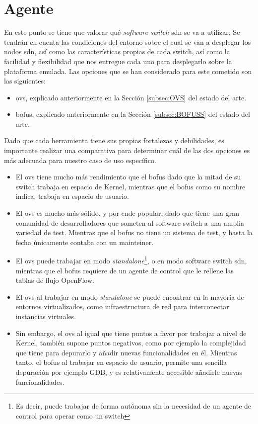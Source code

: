 \section{Agente }
\label{sec:ana_switch}

En este punto se tiene que valorar qué \textit{software switch} \gls{sdn} se va a utilizar. Se tendrán en cuenta las condiciones del entorno sobre el cual se van a desplegar los nodos \gls{sdn}, así como las características propias de cada switch, así como la facilidad y flexibilidad que nos entregue cada uno para desplegarlo sobre la plataforma emulada. Las opciones que se han considerado para este cometido son las siguientes:

\begin{itemize}
    \item \gls{ovs}, explicado anteriormente en la Sección \ref{subsec:OVS} del estado del arte.

    \item \gls{bofus}, explicado anteriormente en la Sección \ref{subsec:BOFUSS} del estado del arte.
\end{itemize}

Dado que cada herramienta tiene sus propias fortalezas y debilidades, es importante realizar una comparativa para determinar cuál de las dos opciones es más adecuada para nuestro caso de uso específico.

\begin{itemize}
    \item El \gls{ovs} tiene mucho más rendimiento que el \gls{bofus} dado que la mitad de su switch trabaja en espacio de Kernel, mientras que el \gls{bofus} como su nombre indica, trabaja en espacio de usuario.
    \item El \gls{ovs} es mucho más sólido, y por ende popular, dado que tiene una gran comunidad de desarrolladores que someten al software switch a una amplia variedad de test. Mientras que el \gls{bofus} no tiene un sistema de test, y hasta la fecha únicamente contaba con un mainteiner.
    \item El \gls{ovs} puede trabajar en modo \textit{standalone}\footnote{Es decir, puede trabajar de forma autónoma sin la necesidad de un agente de control para operar como un switch}, o en modo software switch \gls{sdn}, mientras que el \gls{bofus} requiere de un agente de control que le rellene las tablas de flujo OpenFlow.
    \item El \gls{ovs} al trabajar en modo \textit{standalone} se puede encontrar en la mayoría de entornos virtualizados, como infraestructura de red para interconectar instancias virtuales.
    \item Sin embargo, el \gls{ovs} al igual que tiene puntos a favor por trabajar a nivel de Kernel, también supone puntos negativos, como por ejemplo la complejidad que tiene para depurarlo y añadir nuevas funcionalidades en él. Mientras tanto, el \gls{bofus} al trabajar en espacio de usuario, permite una sencilla  depuración por ejemplo GDB, y es relativamente accesible añadirle nuevas funcionalidades.
\end{itemize}

